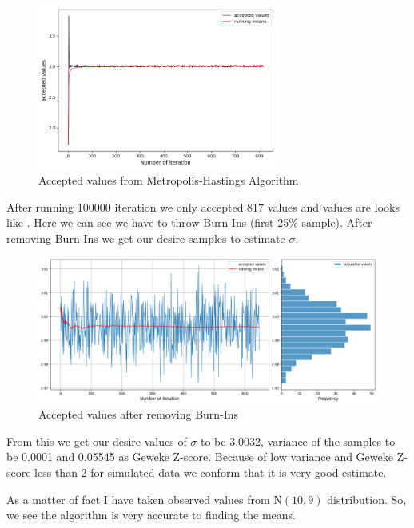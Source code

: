 \begin{example}
	\begin{figure}[H]
		\centering
		\includegraphics[width=0.7\textwidth]{images/metropolis/example2/values.png}
		\caption{Accepted values from Metropolis-Hastings Algorithm}
		\label{fig:example2 values}
	\end{figure}

	After running 100000 iteration we only accepted 817 values and values are looks like . Here we can see we have to throw Burn-Ins (first 25\% sample). After removing Burn-Ins we get our desire samples to estimate $ \sigma $.

	\begin{figure}[H]
		\centering
		\includegraphics[width=1\textwidth]{images/metropolis/example2/values-after-burnin.png}
		\caption{Accepted values after removing Burn-Ins}
	\end{figure}

	From this we get our desire values of $ \sigma $ to be 3.0032, variance of the samples to be 0.0001 and 0.05545 as Geweke Z-score. Because of low variance and Geweke Z-score less than 2 for simulated data we conform that it is very good estimate.

	As a matter of fact I have taken observed values from $ \text{N}(10,9) $ distribution. So, we see the algorithm is very accurate to finding the means.


\end{example}
